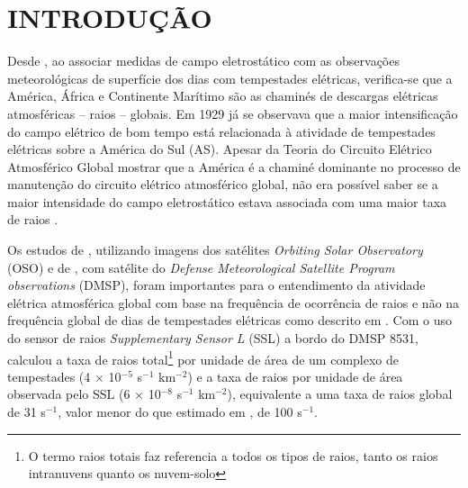 \chapter{INTRODUÇÃO}

Desde , ao associar medidas de campo eletrostático com as observações meteorológicas de superfície dos dias com tempestades elétricas, verifica-se que a  América, África e Continente Marítimo são as chaminés de descargas elétricas atmosféricas -- raios -- globais. Em 1929 já se observava que a maior intensificação do campo elétrico de bom tempo está relacionada à atividade de tempestades elétricas sobre a América do Sul (AS). Apesar da Teoria do Circuito Elétrico Atmosférico Global mostrar que a América é a chaminé dominante no processo de manutenção do circuito elétrico atmosférico global, não era possível saber se a maior intensidade do campo eletrostático estava associada com uma maior taxa de raios \cite{dolezalek1972}.




Os estudos de , utilizando imagens dos satélites \textit{Orbiting Solar Observatory} (OSO) e de  , com satélite do \textit{Defense Meteorological Satellite Program observations} (DMSP), foram importantes para o entendimento da atividade elétrica atmosférica global com base na frequência de ocorrência de raios e não na frequência global de dias de tempestades elétricas como descrito em . Com o uso do sensor de raios \textit{Supplementary Sensor L} (SSL) a bordo do DMSP 8531,  calculou a taxa de raios total\footnote{O termo raios totais faz referencia a todos os tipos de raios, tanto os raios intranuvens quanto os nuvem-solo} por unidade de área de um complexo de tempestades (4 $\times$ 10$^{-5}$ s$^{-1}$ km$^{-2}$) e a taxa de raios por unidade de área observada pelo SSL (6 $\times$ 10$^{-8}$ s$^{-1}$ km$^{-2}$), equivalente a uma taxa de raios global de 31 s$^{-1}$, valor menor do que estimado em , de 100 s$^{-1}$.

